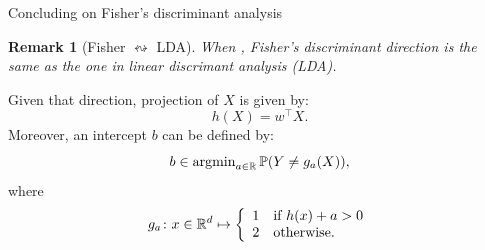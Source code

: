 \documentclass[xcolor={usenames,dvipsnames},handout]{beamer}
\newtheorem{remark}[theorem]{Remark}
\begin{document}

\begin{frame}{Concluding on Fisher's discriminant analysis }
	\begin{remark}[Fisher $\leftrightsquigarrow$ LDA]
		When , Fisher's discriminant direction is the same as the one in linear discrimant analysis (LDA).
	\end{remark}

	Given that direction, projection of $X$ is given by:
	$$
		h(X) = w^\top X.
	$$
	Moreover, an {\color{Vert}intercept} $b$ can be defined by:
	$$
		b \in \operatorname{argmin}_{a \in \mathbb{R}}\mathbb{P}(Y \neq g_a(X)),
	$$
	where
	$$
		g_a \colon x \in \mathbb{R}^d \mapsto
		\left\{ \begin{array}{ll}
			1 & \text{if } h(x) + a > 0 \\
			2 & \text{otherwise}.
		\end{array} \right.
	$$
\end{frame}
\end{document}

